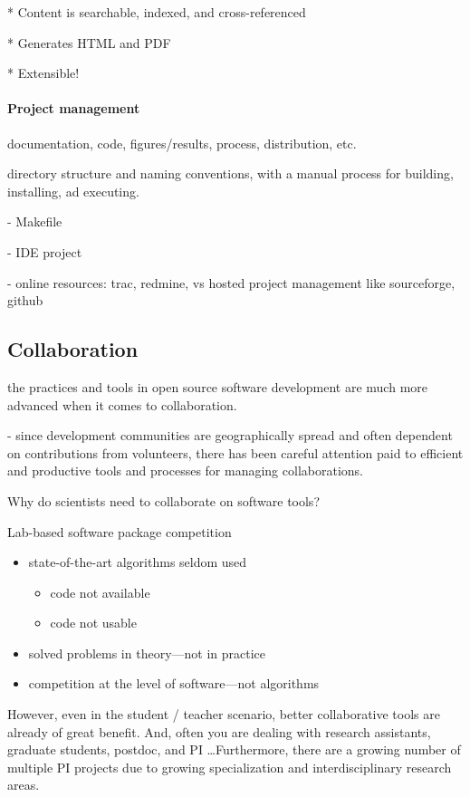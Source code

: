 \documentclass[ChapterTOCs,krantz2]{krantz} %
\begin{document}
* Content is searchable, indexed, and cross-referenced

* Generates HTML and PDF

* Extensible!

\paragraph{ {\bf Project management}}

documentation, code, figures/results, process, distribution, etc.

directory structure and naming conventions, with a manual process
for building, installing, ad executing.

- Makefile

- IDE project

- online resources: trac, redmine, vs hosted project management like
sourceforge, github


\subsection{Collaboration}

the practices and tools in open source software development
are much more advanced when it comes to collaboration.

- since development communities are geographically spread
and often dependent on contributions from volunteers, there
has been careful attention paid to efficient and productive
tools and processes for managing collaborations.

Why do scientists need to collaborate on software tools?

Lab-based software package competition

\begin{itemize}
\item  state-of-the-art algorithms seldom used

\begin{itemize}
\item code not available
\item code not usable
\end{itemize}

\item solved problems in theory---not in practice
\item competition at the level of software---not algorithms
\end{itemize}

However, even in the student / teacher scenario, better collaborative tools
are already of great benefit.  And, often you are dealing with research
assistants, graduate students, postdoc, and PI \ldots  Furthermore, there are a
growing number of multiple PI projects due to growing specialization and
interdisciplinary research areas.
\end{document}
